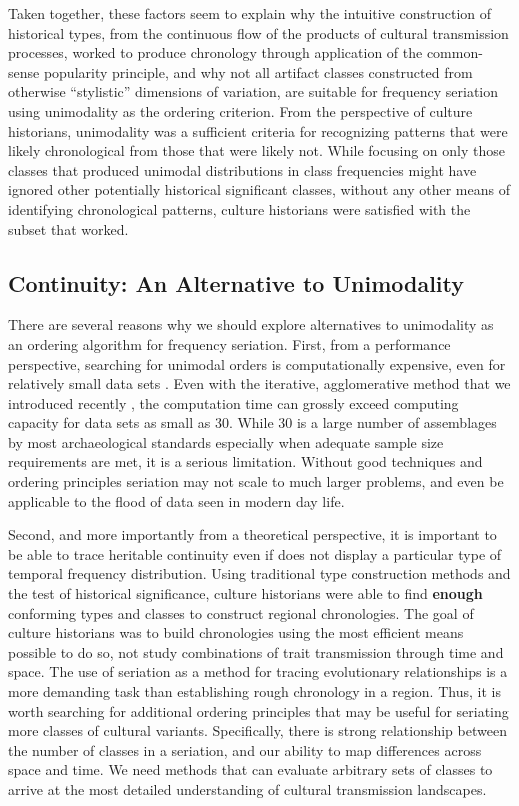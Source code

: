 Taken together, these factors seem to explain why the intuitive
construction of historical types, from the continuous flow of the
products of cultural transmission processes, worked to produce
chronology through application of the common-sense popularity principle,
and why not all artifact classes constructed from otherwise
``stylistic'' dimensions of variation, are suitable for frequency
seriation using unimodality as the ordering criterion. From the
perspective of culture historians, unimodality was a sufficient criteria
for recognizing patterns that were likely chronological from those that
were likely not. While focusing on only those classes that produced
unimodal distributions in class frequencies might have ignored other
potentially historical significant classes, without any other means of
identifying chronological patterns, culture historians were satisfied
with the subset that worked.

\subsection{Continuity: An Alternative to
Unimodality}\label{continuity-an-alternative-to-unimodality}

There are several reasons why we should explore alternatives to
unimodality as an ordering algorithm for frequency seriation. First,
from a performance perspective, searching for unimodal orders is
computationally expensive, even for relatively small data sets
\citep{Madsen2014}. Even with the iterative, agglomerative method that
we introduced recently \citep{lipomadsendunnell2015}, the computation
time can grossly exceed computing capacity for data sets as small as 30.
While 30 is a large number of assemblages by most archaeological
standards especially when adequate sample size requirements are met, it
is a serious limitation. Without good techniques and ordering principles
seriation may not scale to much larger problems, and even be applicable
to the flood of data seen in modern day life.

Second, and more importantly from a theoretical perspective, it is
important to be able to trace heritable continuity even if does not
display a particular type of temporal frequency distribution. Using
traditional type construction methods and the test of historical
significance, culture historians were able to find \textbf{enough}
conforming types and classes to construct regional chronologies. The
goal of culture historians was to build chronologies using the most
efficient means possible to do so, not study combinations of trait
transmission through time and space. The use of seriation as a method
for tracing evolutionary relationships is a more demanding task than
establishing rough chronology in a region. Thus, it is worth searching
for additional ordering principles that may be useful for seriating more
classes of cultural variants. Specifically, there is strong relationship
between the number of classes in a seriation, and our ability to map
differences across space and time. We need methods that can evaluate
arbitrary sets of classes to arrive at the most detailed understanding
of cultural transmission landscapes.

